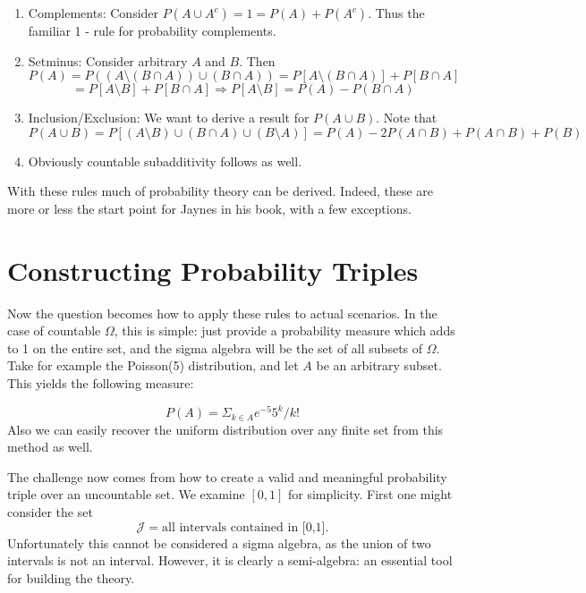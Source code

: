 \documentclass{article}
\begin{document}
\begin{enumerate}

\item Complements: Consider $P(A \cup A^c) = 1 = P(A) + P(A^c)$. Thus the familiar 1 - rule for probability complements. 

\item Setminus: Consider arbitrary $A$ and $B$. Then \[P(A) = P((A\setminus (B\cap A)) \cup (B \cap A)) = P[A\setminus (B\cap A)] + P[B \cap A] \] \[ = P[A\setminus B] + P[B \cap A] \Rightarrow  P[A\setminus B] = P(A) - P(B \cap A) \]

\item Inclusion/Exclusion: We want to derive a result for $P(A \cup B)$. Note that \[P(A \cup B) = P[ (A\setminus B) \cup (B \cap A) \cup (B \setminus A) ] = P(A) - 2P(A \cap B) + P(A \cap B) + P(B)  \]

\item Obviously countable subadditivity follows as well. 
  
\end{enumerate}

With these rules much of probability theory can be derived. Indeed, these are more or less the start point for Jaynes in his book, with a few exceptions. 


\section{Constructing Probability Triples}

Now the question becomes how to apply these rules to actual scenarios. In the case of countable $\Omega$, this is simple: just provide a probability measure which adds to 1 on the entire set, and the sigma algebra will be the set of all subsets of $\Omega$. Take for example the Poisson(5) distribution, and let $A$ be an arbitrary subset. This yields the following measure:

\[P(A) = \Sigma_{k \in A} e^{-5} 5^k / k! \] Also we can easily recover the uniform distribution over any finite set from this method as well. 

The challenge now comes from how to create a valid and meaningful probability triple over an uncountable set. We examine $[0,1]$ for simplicity. First one might consider the set \[\mathcal{J} = \text{all intervals contained in [0,1]}. \] Unfortunately this cannot be considered a sigma algebra, as the union of two intervals is not an interval. However, it is clearly a semi-algebra: an essential tool for building the theory. 
\end{document}

